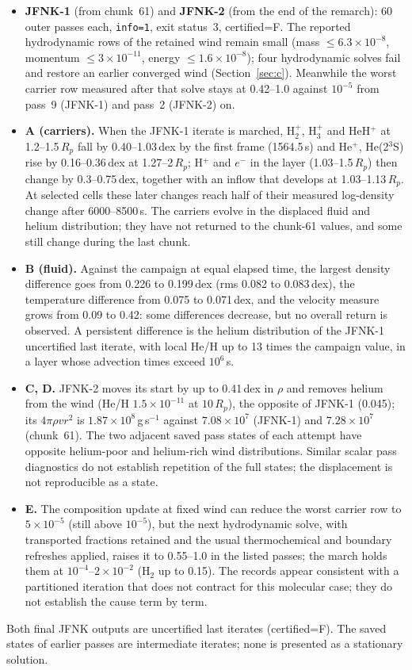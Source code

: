 \documentclass[english,a4paper]{my_memo}
\newcommand{\Rp}{R_p}
\begin{document}
\begin{itemize}
\item \textbf{JFNK-1} (from chunk~61) and \textbf{JFNK-2} (from the end of
the remarch): 60 outer passes each, \texttt{info=1}, exit status~3,
certified=F. The reported hydrodynamic rows of the retained wind remain
small (mass $\le6.3\times10^{-8}$, momentum $\le3\times10^{-11}$, energy
$\le1.6\times10^{-8}$); four hydrodynamic solves fail and restore an earlier
converged wind (Section~\ref{sec:c}). Meanwhile the worst carrier row measured after that solve
stays at 0.42--1.0 against $10^{-5}$ from pass~9 (JFNK-1) and pass~2
(JFNK-2) on.
\item \textbf{A (carriers).} When the JFNK-1 iterate is marched, H$_2^+$,
H$_3^+$ and HeH$^+$ at 1.2--1.5\,$\Rp$ fall by 0.40--1.03\,dex by the
first frame (1564.5\,s) and He$^+$, He(2$^3$S) rise by 0.16--0.36\,dex at
1.27--2\,$\Rp$; H$^+$ and $e^-$ in the layer (1.03--1.5\,$\Rp$) then change by
0.3--0.75\,dex, together with an inflow that develops at
1.03--1.13\,$\Rp$. At selected cells these later changes reach half of their
measured log-density change after 6000--8500\,s. The carriers evolve in the
displaced fluid and helium distribution; they have not returned to the
chunk-61 values, and some still change during the last chunk.
\item \textbf{B (fluid).} Against the campaign at equal elapsed time, the
largest density difference goes from 0.226 to 0.199\,dex (rms 0.082 to
0.083\,dex), the temperature difference from 0.075 to 0.071\,dex, and the
velocity measure grows from 0.09 to 0.42: some differences decrease, but
no overall return is observed. A persistent difference is the helium
distribution of the JFNK-1 uncertified last iterate, with local He/H up to
13 times the campaign value, in a layer whose advection times exceed
$10^6$\,s.
\item \textbf{C, D.} JFNK-2 moves its start by up to 0.41\,dex in $\rho$ and
removes helium from the wind (He/H $1.5\times10^{-11}$ at $10\,\Rp$), the
opposite of JFNK-1 (0.045); its $4\pi\rho v r^2$ is $1.87\times10^8$\,g\,s$^{-1}$
against $7.08\times10^7$ (JFNK-1) and $7.28\times10^7$ (chunk~61). The two adjacent
saved pass states of each attempt have opposite helium-poor and
helium-rich wind distributions. Similar scalar pass diagnostics do not
establish repetition of the full states; the displacement is not
reproducible as a state.
\item \textbf{E.} The composition update at fixed wind can reduce the
worst carrier row to $5\times10^{-5}$ (still above $10^{-5}$), but the next
hydrodynamic solve, with transported fractions retained and the usual
thermochemical and boundary refreshes applied, raises it to 0.55--1.0 in
the listed passes; the march holds them at
$10^{-4}$--$2\times10^{-2}$ (H$_2$ up to 0.15). The records appear consistent with a partitioned
iteration that does not contract for this molecular case; they do not
establish the cause term by term.
\end{itemize}
Both final JFNK outputs are uncertified last iterates (certified=F). The
saved states of earlier passes are intermediate iterates; none is presented
as a stationary solution.
\end{document}
